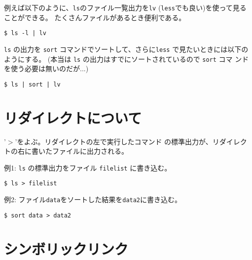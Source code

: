 \documentclass{jreport}
\begin{document}
例えば以下のように、\verb|ls|のファイル一覧出力を\verb|lv|
(\verb|less|でも良い)を使って見ることができる。
たくさんファイルがあるとき便利である。
\begin{screen}
\begin{verbatim}
$ ls -l | lv
\end{verbatim}
\end{screen}
\verb|ls| の出力を \verb|sort| コマンドでソートして、さらに\verb|less|
で見たいときには以下のようにする。
(本当は \verb|ls| の出力はすでにソートされているので \verb|sort| コマ
ンドを使う必要は無いのだが...)
\begin{screen}
\begin{verbatim}
$ ls | sort | lv
\end{verbatim}
\end{screen}

\section{リダイレクトについて}

'$>$'をよぶ。リダイレクトの左で実行したコマンド
の標準出力が、リダイレクトの右に書いたファイルに出力される。

\begin{list}{}{}
\item [例1:] \verb|ls| の標準出力をファイル \verb|filelist| に書き込む。
\begin{screen}
\begin{verbatim}
$ ls > filelist
\end{verbatim}
\end{screen}
\item [例2:] ファイル\verb|data|をソートした結果を\verb|data2|に書き込む。
\begin{screen}
\begin{verbatim}
$ sort data > data2
\end{verbatim}
\end{screen}
\end{list}

\section{シンボリックリンク}
\end{document}
